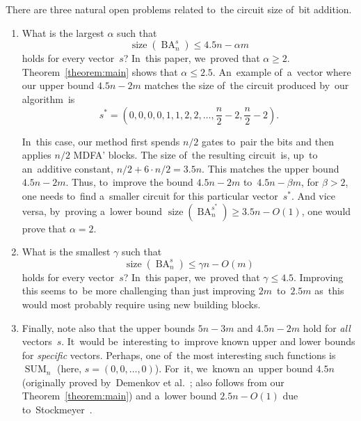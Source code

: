 \documentclass[a4paper, UKenglish, cleveref, autoref,  thm-restate, anonymous]{lipics-v2021}
\DeclareMathOperator{\SUM}{SUM}
\DeclareMathOperator{\BA}{BA}
\DeclareMathOperator{\size}{size}
\begin{document}
    There are three natural open problems related to~the circuit size of~bit addition.
    \begin{enumerate}
        \item What is the largest $\alpha$ such that
        \[\size(\BA_n^s) \le 4.5n-\alpha m\]
        holds for every vector~$s$? In~this paper, we~proved that $\alpha \ge 2$.
        Theorem~\ref{theorem:main} shows that $\alpha \le 2.5$. An~example
        of~a~vector where our upper bound $4.5n-2m$ matches the size of~the circuit
        produced by~our algorithm~is
        \[s^*=\left(0,0,0,0,1,1,2,2,\dotsc,\frac{n}{2}-2, \frac{n}{2}-2\right).\]
        \begin{center}
        \end{center}
        In~this case, our method first spends $n/2$ gates to~pair the bits and then applies $n/2$ MDFA' blocks. The size of~the resulting circuit~is, up~to an~additive constant, $n/2+6\cdot n/2=3.5n$. This matches the upper bound $4.5n-2m$. Thus, to~improve the bound $4.5n-2m$ to~$4.5n-\beta m$, for $\beta > 2$, one needs to~find a~smaller circuit for this particular vector~$s^*$.
        And vice versa, by~proving a~lower bound $\size(\BA_n^{s^*}) \ge 3.5n-O(1)$,
        one would prove that $\alpha=2$.

        \item What is the smallest $\gamma$ such that
        \[\size(\BA_n^s) \le \gamma n-O(m)\]
        holds for every vector~$s$? In~this paper,
        we~proved that $\gamma \le 4.5$.
        Improving this seems to~be more challenging than just improving $2m$~to~$2.5m$ as~this would most probably require using new building blocks.

        \item Finally, note also that the upper bounds $5n-3m$ and $4.5n-2m$ hold for \emph{all} vectors~$s$.
        It~would be~interesting to~improve known upper and lower bounds for \emph{specific} vectors. Perhaps, one of~the most interesting such functions is~$\SUM_n$ (here, $s=(0,0,\dotsc,0)$). For~it, we~known an~upper bound $4.5n$ (originally proved
        by~Demenkov et al.~\cite{DBLP:journals/ipl/DemenkovKKY10}; also follows from our Theorem~\ref{theorem:main}) and a~lower bound $2.5n-O(1)$ due to~Stockmeyer~\cite{DBLP:journals/mst/Stockmeyer77}.
    \end{enumerate}
\end{document}
